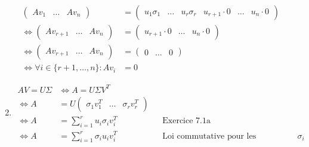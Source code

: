 \documentclass[12pt]{article}
\begin{document}
\begin{enumerate}
\begin{align*}
\begin{pmatrix}
               Av_1 & \dots & Av_n 
        \end{pmatrix} & = \begin{pmatrix}
            u_1 \sigma_1 & \dots & u_r \sigma_r & u_{r+1} \cdot 0 & \dots & u_n \cdot 0
        \end{pmatrix} &&  \\
        \Leftrightarrow \begin{pmatrix}
            Av_{r+1} & \dots & Av_n
        \end{pmatrix}
        & = \begin{pmatrix}
            u_{r+1} \cdot 0 & \dots & u_{n} \cdot 0
        \end{pmatrix} && \\
        \Leftrightarrow \begin{pmatrix}
            Av_{r+1} & \dots & Av_n
        \end{pmatrix}
        & = \begin{pmatrix}
            0 & \dots & 0
        \end{pmatrix} && \\
        \Leftrightarrow \forall i \in \{r+1, \dotsc, n\}: Av_i & = 0
    \end{align*}
    \item 
    \begin{align*}
        AV = U\Sigma & \Leftrightarrow A = U \Sigma V^T && \\
        \Leftrightarrow A & = U \begin{pmatrix}
            \sigma_1 v_1^T & \dots & \sigma_r v_r^T
        \end{pmatrix} && \\
        \Leftrightarrow A & = \sum_{i = 1}^r u_i \sigma_i v_i^T && \text{Exercice 7.1a} \\
        \Leftrightarrow A & = \sum_{i = 1}^r \sigma_i u_i v_i^T && \text{Loi commutative pour les coéfficients réels $\sigma_i$}
    \end{align*}
\end{enumerate}
\end{document}
